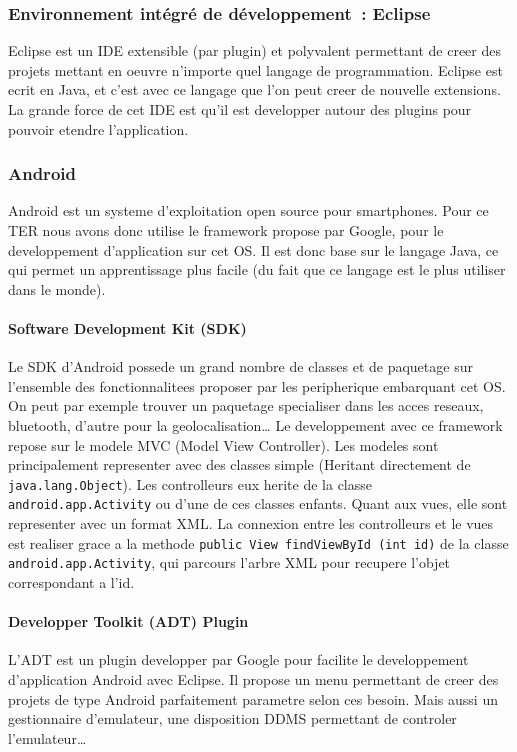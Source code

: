 \documentclass[a4paper,11pt,french]{article}
\def\android{Android\texttrademark{}}
\begin{document}
\subsubsection{Environnement intégré de développement~: Eclipse}
Eclipse est un IDE extensible (par plugin) et polyvalent permettant de creer des projets mettant en oeuvre n'importe quel langage de programmation. Eclipse est ecrit en Java, et c'est avec ce langage que l'on peut creer de nouvelle extensions. La grande force de cet IDE est qu'il est developper autour des plugins pour pouvoir etendre l'application.

\subsubsection{\android{}}
Android est un systeme d'exploitation open source pour smartphones. Pour ce TER nous avons donc utilise le framework propose par Google, pour le developpement d'application sur cet OS. Il est donc base sur le langage Java, ce qui permet un apprentissage plus facile (du fait que ce langage est le plus utiliser dans le monde).

\paragraph{Software Development Kit (SDK)}
Le SDK d'\android{} possede un grand nombre de classes et de paquetage sur l'ensemble des fonctionnalitees proposer par les peripherique embarquant cet OS. On peut par exemple trouver un paquetage specialiser dans les acces reseaux, bluetooth, d'autre pour la geolocalisation\dots{} Le developpement avec ce framework repose sur le modele MVC (Model View Controller). Les modeles sont principalement representer avec des classes simple (Heritant directement de \verb!java.lang.Object!). Les controlleurs eux herite de la classe \verb!android.app.Activity! ou d'une de ces classes enfants. Quant aux vues, elle sont representer avec un format XML.
La connexion entre les controlleurs et le vues est realiser grace a la methode \verb!public View findViewById (int id)! de la classe \verb!android.app.Activity!, qui parcours l'arbre XML pour recupere l'objet correspondant a l'id.

\paragraph{Developper Toolkit (ADT) Plugin}
L'ADT est un plugin developper par Google pour facilite le developpement d'application \android{} avec Eclipse. Il propose un menu permettant de creer des projets de type \android{} parfaitement parametre selon ces besoin. Mais aussi un gestionnaire d'emulateur, une disposition DDMS permettant de controler l'emulateur\dots{}
\end{document}
